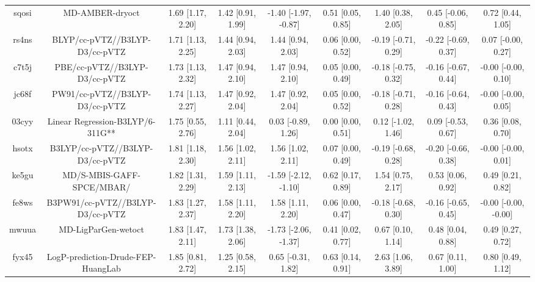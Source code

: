 \documentclass{article}
\begin{document}
\begin{center}
\begin{longtable}{|ccccccccc|}
 sqosi &                                    MD-AMBER-dryoct &  1.69 [1.17, 2.20] &  1.42 [0.91, 1.99] &  -1.40 [-1.97, -0.87] &  0.51 [0.05, 0.85] &    1.40 [0.38, 2.05] &   0.45 [-0.06, 0.85] &     0.72 [0.44, 1.05] \\
 rs4ns &                     BLYP/cc-pVTZ//B3LYP-D3/cc-pVTZ &  1.71 [1.13, 2.25] &  1.44 [0.94, 2.03] &     1.44 [0.94, 2.03] &  0.06 [0.00, 0.52] &  -0.19 [-0.71, 0.29] &  -0.22 [-0.69, 0.37] &    0.07 [-0.00, 0.27] \\
 c7t5j &                      PBE/cc-pVTZ//B3LYP-D3/cc-pVTZ &  1.73 [1.13, 2.32] &  1.47 [0.94, 2.10] &     1.47 [0.94, 2.10] &  0.05 [0.00, 0.49] &  -0.18 [-0.75, 0.32] &  -0.16 [-0.67, 0.44] &   -0.00 [-0.00, 0.10] \\
 jc68f &                     PW91/cc-pVTZ//B3LYP-D3/cc-pVTZ &  1.74 [1.13, 2.27] &  1.47 [0.92, 2.04] &     1.47 [0.92, 2.04] &  0.05 [0.00, 0.52] &  -0.18 [-0.71, 0.28] &  -0.16 [-0.64, 0.43] &   -0.00 [-0.00, 0.05] \\
 03cyy &                   Linear Regression-B3LYP/6-311G** &  1.75 [0.55, 2.76] &  1.11 [0.44, 2.04] &    0.03 [-0.89, 1.26] &  0.00 [0.00, 0.51] &   0.12 [-1.02, 1.46] &   0.09 [-0.53, 0.67] &     0.36 [0.08, 0.70] \\
 hsotx &                    B3LYP/cc-pVTZ//B3LYP-D3/cc-pVTZ &  1.81 [1.18, 2.30] &  1.56 [1.02, 2.11] &     1.56 [1.02, 2.11] &  0.07 [0.00, 0.49] &  -0.19 [-0.68, 0.28] &  -0.20 [-0.66, 0.38] &   -0.00 [-0.00, 0.01] \\
 ke5gu &                          MD/S-MBIS-GAFF-SPCE/MBAR/ &  1.82 [1.31, 2.29] &  1.59 [1.11, 2.13] &  -1.59 [-2.12, -1.10] &  0.62 [0.17, 0.89] &    1.54 [0.75, 2.17] &    0.53 [0.06, 0.92] &     0.49 [0.21, 0.82] \\
 fe8ws &                   B3PW91/cc-pVTZ//B3LYP-D3/cc-pVTZ &  1.83 [1.27, 2.37] &  1.58 [1.11, 2.20] &     1.58 [1.11, 2.20] &  0.06 [0.00, 0.47] &  -0.18 [-0.68, 0.30] &  -0.16 [-0.65, 0.45] &  -0.00 [-0.00, -0.00] \\
 mwuua &                                MD-LigParGen-wetoct &  1.83 [1.47, 2.11] &  1.73 [1.38, 2.06] &  -1.73 [-2.06, -1.37] &  0.41 [0.02, 0.77] &    0.67 [0.10, 1.14] &    0.48 [0.04, 0.88] &     0.49 [0.27, 0.72] \\
 fyx45 &                 LogP-prediction-Drude-FEP-HuangLab &  1.85 [0.81, 2.72] &  1.25 [0.58, 2.15] &    0.65 [-0.31, 1.82] &  0.63 [0.14, 0.91] &    2.63 [1.06, 3.89] &    0.67 [0.11, 1.00] &     0.80 [0.49, 1.12] \\

\end{longtable}
\end{center}
\end{document}
